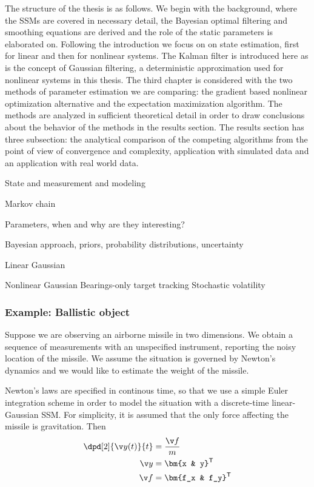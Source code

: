 The structure of the thesis is as follows. We begin with the background, where
the SSMs are covered in necessary detail, the Bayesian optimal filtering
and smoothing equations are derived and the role of the static parameters is elaborated
on. Following the introduction we focus on on state estimation, first for linear
and then for nonlinear systems. The Kalman filter is introduced here as is the
concept of Gaussian filtering, a deterministic approximation used for nonlinear systems 
in this thesis. The third chapter is considered with the two methods
of parameter estimation we are comparing: the gradient based nonlinear optimization alternative
and the expectation maximization algorithm. The methods are analyzed in sufficient
theoretical detail in order to draw conclusions about the behavior of the methods
in the results section. The results section has three subsection: the analytical 
comparison of the competing algorithms from the point of view of convergence
and complexity, application with simulated data and an application with real world data.

State and measurement and modeling

Markov chain

Parameters, when and why are they interesting?

Bayesian approach, priors, probability distributions, uncertainty

Linear Gaussian 
  


Nonlinear Gaussian
  Bearings-only target tracking
  Stochastic volatility



 

\subsubsection*{Example: Ballistic object}
Suppose we are observing an airborne missile in two dimensions.
We obtain a sequence of measurements with an unspecified instrument,
reporting the noisy location of the missile. We assume the situation
is governed by Newton's dynamics and we would like to estimate the weight
of the missile.

Newton's laws are specified in continous time, so that we use a simple
Euler integration scheme in order to model the situation with a discrete-time 
linear-Gaussian SSM. For simplicity, it is assumed that the only force affecting
the missile is gravitation. Then
\begin{align}
	\dpd[2]{\y(t)}{t} &= \frac{\f}{m}\\
	\y &= \bm{x & y}^\tr\\
	\f &= \bm{f_x & f_y}^\tr	
\end{align}

 



